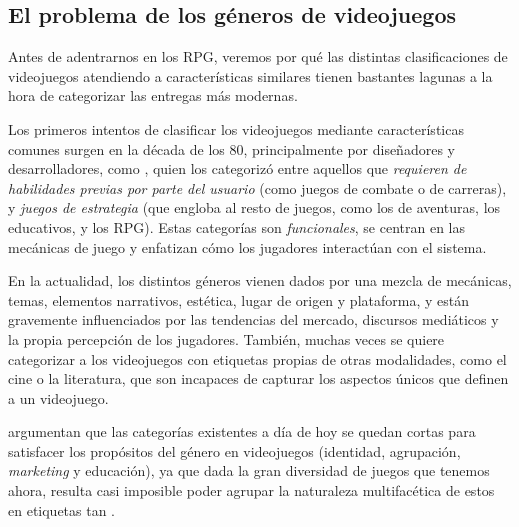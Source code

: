 \subsection{El problema de los géneros de videojuegos}
Antes de adentrarnos en los RPG, veremos por qué las distintas clasificaciones de videojuegos atendiendo a características similares tienen bastantes lagunas a la hora de categorizar las entregas más modernas.

\medskip

Los primeros intentos de clasificar los videojuegos mediante características comunes surgen en la década de los 80, principalmente por diseñadores y desarrolladores, como \cite{Crawford84}, quien los categorizó entre aquellos que \textit{requieren de habilidades previas por parte del usuario} (como juegos de combate o de carreras), y \textit{juegos de estrategia} (que engloba al resto de juegos, como los de aventuras, los educativos, y los RPG). Estas categorías son \textit{funcionales}, se centran en las mecánicas de juego y enfatizan cómo los jugadores interactúan con el sistema.

\smallskip

En la actualidad, los distintos géneros vienen dados por una mezcla de mecánicas, temas, elementos narrativos, estética, lugar de origen y plataforma, y están gravemente influenciados por las tendencias del mercado, discursos mediáticos y la propia percepción de los jugadores. También, muchas veces se quiere categorizar a los videojuegos con etiquetas propias de otras modalidades, como el cine o la literatura, que son incapaces de capturar los aspectos únicos que definen a un videojuego.

\smallskip

\cite{FailGeneros} argumentan que las categorías existentes a día de hoy se quedan cortas para satisfacer los propósitos del género en videojuegos (identidad, agrupación, \textit{marketing} y educación), ya que dada la gran diversidad de juegos que tenemos ahora, resulta casi imposible poder agrupar la naturaleza multifacética de estos en etiquetas tan .


\smallskip

